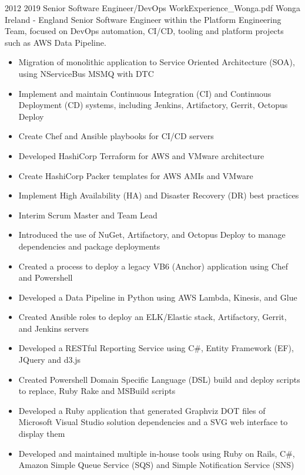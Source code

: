 \begin{twenty}
\twentyitem
  {2012}
  {2019}
  {Senior Software Engineer/DevOps}
  {WorkExperience_Wonga.pdf}
  {Wonga}
  {Ireland - England}
  {Senior Software Engineer within the Platform Engineering Team, focused on DevOps automation, CI/CD, tooling and platform projects such as AWS Data Pipeline.}
  {\begin{itemize}
    \item Migration of monolithic application to Service Oriented Architecture (SOA), using NServiceBus MSMQ with DTC
    \item Implement and maintain Continuous Integration (CI) and Continuous Deployment (CD) systems, including Jenkins, Artifactory, Gerrit, Octopus Deploy
    \item Create Chef and Ansible playbooks for CI/CD servers
    \item Developed HashiCorp Terraform for AWS and VMware architecture
    \item Create HashiCorp Packer templates for AWS AMIs and VMware
    \item Implement High Availability (HA) and Disaster Recovery (DR) best practices
    \item Interim Scrum Master and Team Lead
  \end{itemize}
  }
  {\begin{itemize}
    \item Introduced the use of NuGet, Artifactory, and Octopus Deploy to manage dependencies and package deployments
    \item Created a process to deploy a legacy VB6 (Anchor) application using Chef and Powershell
    \item Developed a Data Pipeline in Python using AWS Lambda, Kinesis, and Glue
    \item Created Ansible roles to deploy an ELK/Elastic stack, Artifactory, Gerrit, and Jenkins servers
    \item Developed a RESTful Reporting Service using C\#, Entity Framework (EF), JQuery and d3.js
    \item Created Powershell Domain Specific Language (DSL) build and deploy scripts to replace, Ruby Rake and MSBuild scripts
    \item Developed a Ruby application that generated Graphviz DOT files of Microsoft Visual Studio solution dependencies and a SVG web interface to display them
    \item Developed and maintained multiple in-house tools using Ruby on Rails, C\#, Amazon Simple Queue Service (SQS) and Simple Notification Service (SNS)
  \end{itemize}
  }
\end{twenty}
